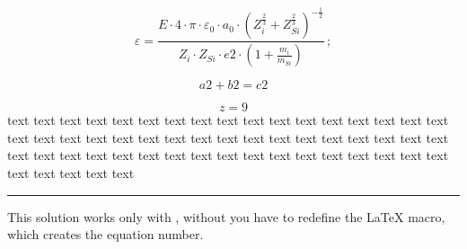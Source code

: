 \begin{table}[htb]
\makeatletter
\@fleqntrue
\let\old@mathmargin=\@mathmargin
\@mathmargin=-1sp
\let\oldmathindent=\mathindent
\let\mathindent=\@mathmargin
\newsavebox{\myendhook} %
\def\tagform@#1{{(\maketag@@@{\ignorespaces#1\unskip\@@italiccorr)}
  \makebox[0pt][r]{%
    \makebox[0.5\textwidth][l]{\usebox{\myendhook}}}%
  \global\sbox{\myendhook}{}%
}}
\makeatother
{}
%
\begin{equation}
\varepsilon = \frac{E \cdot 4 \cdot \pi \cdot \varepsilon_{0}
\cdot a_0 \cdot \left( Z_i^{\frac{2}{3}} + Z_{Si}^{\frac{2}{3}}
\right)^{-\frac{1}{2}}} {Z_i \cdot Z_{Si} \cdot e2 \cdot \left( 1
+ \frac{m_i}{m_{Si}} \right)}\,;
\end{equation}


\begin{equation}
a2+b2=c2
\end{equation}

\begin{equation}
z = 9
\end{equation}
text text text text text text text text text text text text text text
text text text text text text text text text text text text text text
text text text text text text text text text text text text text text
text text text text text text text text text text text text text text

\endgroup
\noindent\rule{\linewidth}{1pt}

\medskip
This solution works only with \AmSmath{}, without you have to redefine the
\LaTeX{} macro, which creates the equation number.


\end{table}
